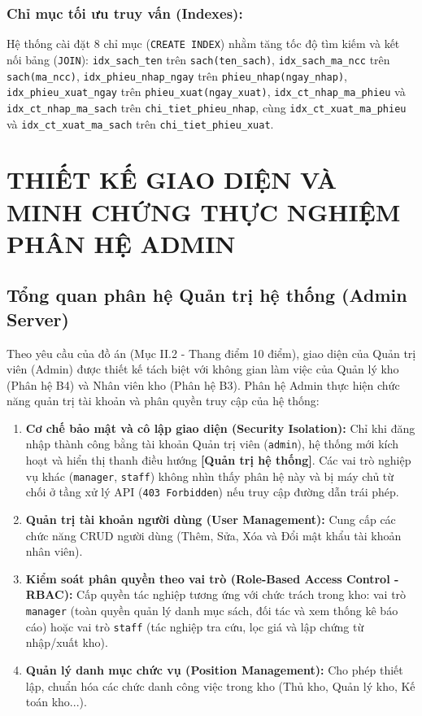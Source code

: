 \documentclass[12pt,a4paper]{article}
\begin{document}
\subsubsection*{Chỉ mục tối ưu truy vấn (Indexes):}
Hệ thống cài đặt 8 chỉ mục (\texttt{CREATE INDEX}) nhằm tăng tốc độ tìm kiếm và kết nối bảng (\texttt{JOIN}): \texttt{idx\_sach\_ten} trên \texttt{sach(ten\_sach)}, \texttt{idx\_sach\_ma\_ncc} trên \texttt{sach(ma\_ncc)}, \texttt{idx\_phieu\_nhap\_ngay} trên \texttt{phieu\_nhap(ngay\_nhap)}, \texttt{idx\_phieu\_xuat\_ngay} trên \texttt{phieu\_xuat(ngay\_xuat)}, \texttt{idx\_ct\_nhap\_ma\_phieu} và \texttt{idx\_ct\_nhap\_ma\_sach} trên \texttt{chi\_tiet\_phieu\_nhap}, cùng \texttt{idx\_ct\_xuat\_ma\_phieu} và \texttt{idx\_ct\_xuat\_ma\_sach} trên \texttt{chi\_tiet\_phieu\_xuat}.

\newpage
\section{THIẾT KẾ GIAO DIỆN VÀ MINH CHỨNG THỰC NGHIỆM PHÂN HỆ ADMIN}
\label{sec:giao-dien-admin}

\subsection{Tổng quan phân hệ Quản trị hệ thống (Admin Server)}
\label{subsec:tong-quan-admin}

Theo yêu cầu của đồ án (Mục II.2 - Thang điểm 10 điểm), giao diện của Quản trị viên (Admin) được thiết kế tách biệt với không gian làm việc của Quản lý kho (Phân hệ B4) và Nhân viên kho (Phân hệ B3). Phân hệ Admin thực hiện chức năng quản trị tài khoản và phân quyền truy cập của hệ thống:
\begin{enumerate}
    \item \textbf{Cơ chế bảo mật và cô lập giao diện (Security Isolation):} Chỉ khi đăng nhập thành công bằng tài khoản Quản trị viên (\texttt{admin}), hệ thống mới kích hoạt và hiển thị thanh điều hướng \textbf{[Quản trị hệ thống]}. Các vai trò nghiệp vụ khác (\texttt{manager}, \texttt{staff}) không nhìn thấy phân hệ này và bị máy chủ từ chối ở tầng xử lý API (\texttt{403 Forbidden}) nếu truy cập đường dẫn trái phép.
    \item \textbf{Quản trị tài khoản người dùng (User Management):} Cung cấp các chức năng CRUD người dùng (Thêm, Sửa, Xóa và Đổi mật khẩu tài khoản nhân viên).
    \item \textbf{Kiểm soát phân quyền theo vai trò (Role-Based Access Control - RBAC):} Cấp quyền tác nghiệp tương ứng với chức trách trong kho: vai trò \texttt{manager} (toàn quyền quản lý danh mục sách, đối tác và xem thống kê báo cáo) hoặc vai trò \texttt{staff} (tác nghiệp tra cứu, lọc giá và lập chứng từ nhập/xuất kho).
    \item \textbf{Quản lý danh mục chức vụ (Position Management):} Cho phép thiết lập, chuẩn hóa các chức danh công việc trong kho (Thủ kho, Quản lý kho, Kế toán kho...).
\end{enumerate}
\end{document}
